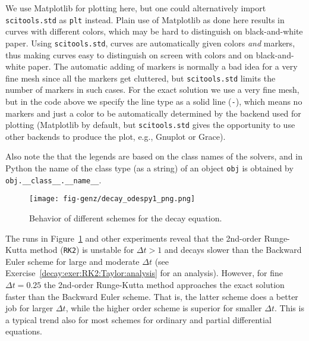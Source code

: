 \documentclass[graybox,sectrefs,envcountresetchap,open=right,final]{svmonodo}
\newenvironment{notice_mdfboxadmon}[1][]{
\begin{notice_mdfboxmdframed}[frametitle=#1]
}
{
\end{notice_mdfboxmdframed}
}
\begin{document}
\begin{notice_mdfboxadmon}
We use Matplotlib for
plotting here, but one could alternatively import \texttt{scitools.std} as \texttt{plt} instead. Plain use of Matplotlib as done here results in
curves with different colors, which may be hard to distinguish on
black-and-white paper. Using \texttt{scitools.std}, curves are
automatically given colors \emph{and} markers, thus making curves easy
to distinguish on screen with colors and on black-and-white paper.
The automatic adding of markers is normally a bad idea for a
very fine mesh since all the markers get cluttered, but \texttt{scitools.std} limits
the number of markers in such cases.
For the exact solution we use a very fine mesh, but in the code
above we specify the line type as a solid line (\texttt{-}), which means
no markers and just a color to be automatically determined by
the backend used for plotting (Matplotlib by default, but
\texttt{scitools.std} gives the opportunity to use other backends
to produce the plot, e.g., Gnuplot or Grace).

Also note the that the legends
are based on the class names of the solvers, and in Python the name of
the class type (as a string) of an object \texttt{obj} is obtained by
\Verb!obj.__class__.__name__!.
\end{notice_mdfboxadmon}




\begin{figure}[!ht]  %
  \centerline{\texttt{[image: fig-genz/decay\_odespy1\_png.png]}}
  \caption{
  Behavior of different schemes for the decay equation. \label{decay:odespy:fig1}
  }
\end{figure}



The runs in Figure~\ref{decay:odespy:fig1}
and other experiments reveal that the 2nd-order Runge-Kutta
method (\texttt{RK2}) is unstable for $\Delta t>1$ and decays slower than the
Backward Euler scheme for large and moderate $\Delta t$ (see Exercise~\ref{decay:exer:RK2:Taylor:analysis} for an analysis).  However, for
fine $\Delta t = 0.25$ the 2nd-order Runge-Kutta method approaches
the exact solution faster than the Backward Euler scheme.  That is,
the latter scheme does a better job for larger $\Delta t$, while the
higher order scheme is superior for smaller $\Delta t$. This is a
typical trend also for most schemes for ordinary and partial
differential equations.
\end{document}
